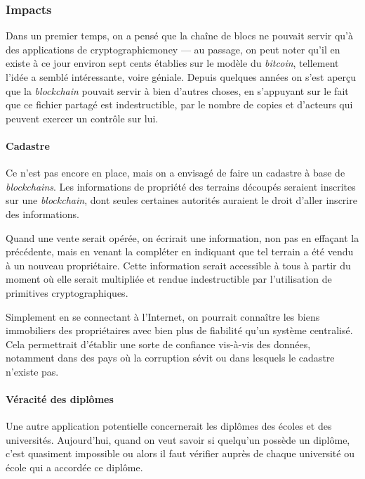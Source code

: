 \subsubsection[Impacts]{Impacts}
\label{subsub:II.3.1.2}



%
Dans un premier temps, on a pensé que la chaîne de blocs ne pouvait servir qu'à des applications de \gls{cryptographicmoney} --- au passage, on peut noter qu'il en existe à ce jour environ sept cents établies sur le modèle du \textit{bitcoin}, tellement l'idée a semblé intéressante, voire géniale.
Depuis quelques années on s'est aperçu que la \textit{blockchain} pouvait servir à bien d'autres choses, en s’appuyant sur le fait que ce fichier partagé est indestructible, par le nombre de copies et d'acteurs qui peuvent exercer un contrôle sur lui.

\paragraph{Cadastre} Ce n'est pas encore en place, mais on a envisagé de faire un cadastre à base de \textit{blockchains}. Les informations de propriété des terrains découpés seraient inscrites sur une \textit{blockchain}, dont seules certaines autorités auraient le droit d'aller inscrire des informations.

%
Quand une vente serait opérée, on écrirait une information, non pas en effaçant la précédente, mais en venant la compléter en indiquant que tel terrain a été vendu à un nouveau propriétaire. Cette information serait accessible à tous à partir du moment où elle serait multipliée et rendue indestructible par l'utilisation de primitives cryptographiques.

Simplement en se connectant à l'Internet, on pourrait connaître les biens immobiliers des propriétaires avec bien plus de fiabilité qu'un système centralisé. Cela permettrait d'établir une sorte de confiance vis-à-vis des données, notamment dans des pays où la corruption sévit ou dans lesquels le cadastre n'existe pas.

\paragraph{Véracité des diplômes} Une autre application potentielle concernerait les diplômes des écoles et des universités. Aujourd'hui, quand on veut savoir si quelqu'un possède un diplôme, c'est quasiment impossible ou alors il faut vérifier auprès de chaque université ou école qui a accordée ce diplôme.

